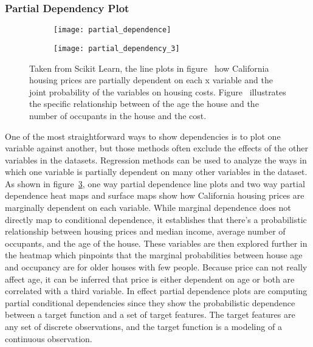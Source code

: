 \documentclass[../main.text]{subfiles}
\begin{document}
\subsubsection{Partial Dependency Plot}

\begin{figure}
    \begin{subfigure}{\textwidth}
    \centering
      \texttt{[image: partial\_dependence]}
      \label{fig:fivechart}
    \end{subfigure}

    \bigskip
    \begin{subfigure}{\textwidth}
    \centering
    \texttt{[image: partial\_dependency\_3]}
    \label{fig:threechart}
    \end{subfigure}

  \caption{Taken from Scikit Learn\cite{_partial_????}, the line plots in figure~ how California housing prices are partially dependent on each x variable and the joint probability of the variables on housing costs. Figure~ illustrates the specific relationship between  of the age the house and the number of occupants in the house and the cost.}
  \label{fig:partialdependence}
\end{figure}

One of the most straightforward ways to show dependencies is to plot one
variable against another, but those methods often exclude the effects of the
other variables in the datasets. Regression methods can be used to analyze the
ways in which one variable is partially dependent on many other variables in
the dataset\cite{_elements_2009,scikit-learn}. As shown in figure~\ref{fig:partialdependence}, one way partial dependence line plots and two way partial dependence heat maps and surface maps show how California housing prices are marginally dependent on each variable. While marginal dependence does not directly map to conditional dependence, it establishes that there's a probabilistic relationship between housing prices and median income, average number of occupants, and the age of the house. These variables are then explored further in the heatmap which pinpoints that the marginal probabilities between house age and occupancy are for older houses with few people. Because price can not really affect age, it can be inferred that price is either dependent on age or both are correlated with a third variable. In effect partial dependence plots are computing partial conditional dependencies since they show the probabilistic dependence between a target function and a set of target features. The target features are any set of discrete observations, and the target function is a modeling of a continuous observation. 
\end{document}
